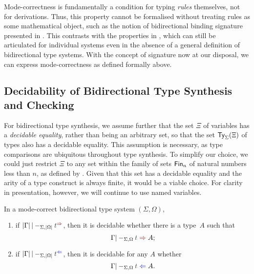 \begin{remark}
  Mode-correctness is fundamentally a condition for typing \emph{rules} themselves, not for derivations.
  Thus, this property cannot be formalised without treating rules as some mathematical object, such as the notion of bidirectional binding signature presented in .
  This contrasts with the properties in , which can still be articulated for individual systems even in the absence of a general definition of bidirectional type systems.
  With the concept of signature now at our disposal, we can express mode-correctness as defined formally above.
\end{remark}
\subsection{Decidability of Bidirectional Type Synthesis and Checking}\label{subsec:bidirectional-synthesis-checking}

For bidirectional type synthesis, we assume further that the set $\Xi$ of variables has a \emph{decidable equality}, rather than being an arbitrary set, so that the set $\mathsf{Ty}_{\Sigma}(\Xi)$ of types also has a decidable equality.
This assumption is necessary, as type comparisons are ubiquitous throughout type synthesis. 
To simplify our choice, we could just restrict $\Xi$ to any set within the family of sets $\mathsf{Fin}_n$ of natural numbers less than $n$, as defined by \citet{Dybjer1994}.
Given that this set has a decidable equality and the arity of a type construct is always finite, it would be a viable choice.
For clarity in presentation, however, we will continue to use named variables.

\begin{theorem} \label{thm:bidirectional-type-synthesis-checking}
  In a mode-correct bidirectional type system $(\Sigma, \Omega)$,
  \begin{enumerate}
    \item if $\erase{\Gamma} |-_{\Sigma, \erase{\Omega}} \isTerm{t}^{\syn}$, then it is decidable whether there is a type~$A$ such that
      \[
        \Gamma |-_{\Sigma, \Omega} \isTerm{t} \syn A;
      \]
    \item if $\erase{\Gamma} |-_{\Sigma, \erase{\Omega}} \isTerm{t}^{\chk}$, then it is decidable for any $A$ whether
      \[
        \Gamma |-_{\Sigma, \Omega} \isTerm{t} \chk A.
      \]
  \end{enumerate}
\end{theorem}

